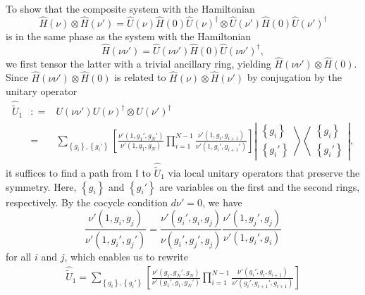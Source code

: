 \documentclass[sort&compress]{elsarticle}
\theoremstyle{theoremstyle}
\theoremstyle{framedtheoremstyle}
\theoremstyle{definitionstyle}
\theoremstyle{definitionstyle}
\theoremstyle{definitionstyle}
\theoremstyle{definitionstyle}
\theoremstyle{nameddefinitionstyle}
\theoremstyle{framednameddefinitionstyle}
\theoremstyle{proofstyle}
\theoremstyle{definitionstyle}
\newcommand{\coloneq}{\mathrel{\mathop:}=}
\newcommand{\paren}[1]{\left( #1 \right)}
\newcommand{\brackets}[1]{\left[ #1 \right]}
\newcommand{\braces}[1]{\left\{ #1 \right\}}
\newcommand{\ketbra}[2]{\left| #1 \right\rangle\left\langle #2\right|}
\begin{document}
\begin{appendices}
To show that the composite system with the Hamiltonian
\begin{equation}
\hat H(\nu) \otimes \hat H(\nu') = \hat U(\nu) \hat H(0) \hat U(\nu)^\dag \otimes \hat U(\nu') \hat H(0) \hat U(\nu')^\dag
\end{equation}
is in the same phase as the system with the Hamiltonian
\begin{equation}
\hat H(\nu \nu') = \hat U(\nu \nu') \hat H(0) \hat U(\nu \nu')^\dag,
\end{equation}
we first tensor the latter with a trivial ancillary ring, yielding $\hat H(\nu\nu') \otimes \hat H(0)$. Since $\hat H(\nu\nu') \otimes \hat H(0)$ is related to $\hat H(\nu) \otimes \hat H(\nu')$ by conjugation by the unitary operator
\begin{eqnarray}
\hat{\widetilde U}_1 &\coloneq& U(\nu \nu') U(\nu)^\dag \otimes U(\nu')^\dag \nonumber\\
&=& \sum_{\braces{g_i}, \braces{g_i'}} 
\brackets{
\frac{ \nu'\paren{1,g_1',g_N'} }{ \nu'\paren{1,g_1,g_N} }
\prod_{i=1}^{N-1} \frac{ \nu'\paren{ 1, g_i, g_{i+1} } }{ \nu'\paren{ 1, g_i', g_{i+1}' } } 
}
\ketbra{ \begin{matrix} \braces{g_i} \\ \braces{g_i'} \end{matrix} }{ \begin{matrix} \braces{g_i} \\ \braces{g_i'} \end{matrix} },\label{adding_cohomology_classes_stacking_SPT_phases_U1}
\end{eqnarray}
it suffices to find a path from $\mathbb I$ to $\hat{\widetilde U}_1$ via local unitary operators that preserve the symmetry. Here, $\braces{g_i}$ and $\braces{g_i'}$ are variables on the first and the second rings, respectively. By the cocycle condition $d\nu' = 0$, we have
\begin{equation}
\frac{ \nu'\paren{1, g_i, g_j} }{ \nu'\paren{1, g_i', g_j' } } = \frac{ \nu'\paren{g_i' , g_i, g_j} }{ \nu\paren{ g_i' , g_j', g_j } } \frac{ \nu'\paren{ 1, g_j', g_j } }{ \nu'\paren{ 1, g_i', g_i } }\label{adding_cohomology_classes_stacking_SPT_phases_nu}
\end{equation}
for all $i$ and $j$,
which enables us to rewrite
\begin{eqnarray}
\hat{\widetilde U}_1 =
\sum_{\braces{g_i}, \braces{g_i'}} 
\brackets{
\frac{ \nu'\paren{g_1,g_N'
,g_N} }{ \nu'\paren{g_1',g_1,g_N'} }
\prod_{i=1}^{N-1} \frac{ \nu'\paren{ g_i', g_i, g_{i+1} } }{ \nu'\paren{ g_i', g_{i+1}', g_{i+1} } } }

\end{eqnarray}
\end{appendices}
\end{document}
